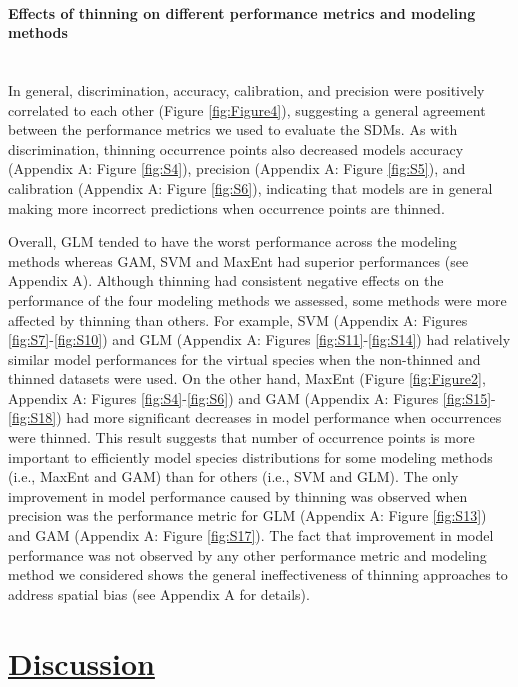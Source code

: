 \paragraph*{Effects of thinning on different performance metrics and modeling methods }\mbox{}\\ 
In general, discrimination, accuracy, calibration, and precision were positively correlated to each other (Figure \ref{fig:Figure4}), suggesting a general agreement between the performance metrics we used to evaluate the SDMs. As with discrimination, thinning occurrence points also decreased models accuracy (Appendix A: Figure \ref{fig:S4}), precision (Appendix A: Figure \ref{fig:S5}), and calibration (Appendix A: Figure \ref{fig:S6}), indicating that models are in general making more incorrect predictions when occurrence points are thinned.


Overall, GLM tended to have the worst performance across the modeling methods whereas GAM, SVM and MaxEnt had superior performances (see Appendix A). Although thinning had consistent negative effects on the performance of the four modeling methods we assessed, some methods were more affected by thinning than others. For example, SVM (Appendix A: Figures \ref{fig:S7}-\ref{fig:S10}) and GLM (Appendix A: Figures \ref{fig:S11}-\ref{fig:S14}) had relatively similar model performances for the virtual species when the non-thinned and thinned datasets were used. On the other hand, MaxEnt (Figure \ref{fig:Figure2}, Appendix A: Figures \ref{fig:S4}-\ref{fig:S6}) and GAM (Appendix A: Figures \ref{fig:S15}-\ref{fig:S18}) had more significant decreases in model performance when occurrences were thinned. This result suggests that number of occurrence points is more important to efficiently model species distributions for some modeling methods (i.e., MaxEnt and GAM) than for others (i.e., SVM and GLM). The only improvement in model performance caused by thinning was observed when precision was the performance metric for GLM (Appendix A: Figure \ref{fig:S13}) and GAM (Appendix A: Figure \ref{fig:S17}). The fact that improvement in model performance was not observed by any other performance metric and modeling method we considered shows the general ineffectiveness of thinning approaches to address spatial bias (see Appendix A for details). 


\section*{\textbf{\underline{Discussion}}}

